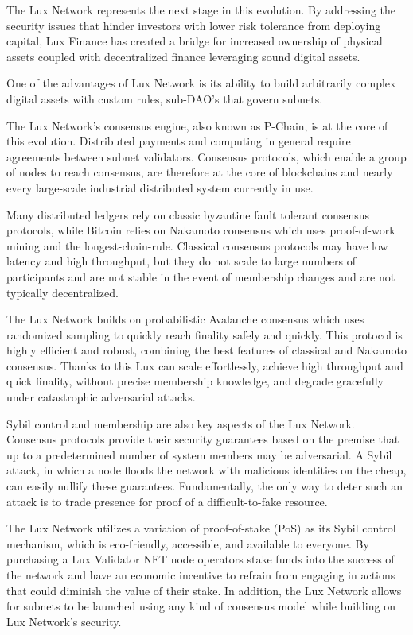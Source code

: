 \documentclass[11pt]{article}
\begin{document}
The Lux Network represents the next stage in this evolution. By addressing the security issues that hinder investors with lower risk tolerance from deploying capital, Lux Finance has created a bridge for increased ownership of physical assets coupled with decentralized finance leveraging sound digital assets.


One of the advantages of Lux Network is its ability to build arbitrarily complex digital assets with custom rules, sub-DAO's that govern subnets.


The Lux Network's consensus engine, also known as P-Chain, is at the core of this evolution. Distributed payments and computing in general require agreements between subnet validators. Consensus protocols, which enable a group of nodes to reach consensus, are therefore at the core of blockchains and nearly every large-scale industrial distributed system currently in use.


Many distributed ledgers rely on classic byzantine fault tolerant consensus protocols, while Bitcoin relies on Nakamoto consensus which uses proof-of-work mining and the longest-chain-rule. Classical consensus protocols may have low latency and high throughput, but they do not scale to large numbers of participants and are not stable in the event of membership changes and are not typically decentralized.


The Lux Network builds on probabilistic Avalanche consensus which uses randomized sampling to quickly reach finality safely and quickly. This protocol is highly efficient and robust, combining the best features of classical and Nakamoto consensus. Thanks to this Lux can scale effortlessly, achieve high throughput and quick finality, without precise membership knowledge, and degrade gracefully under catastrophic adversarial attacks.


Sybil control and membership are also key aspects of the Lux Network. Consensus protocols provide their security guarantees based on the premise that up to a predetermined number of system members may be adversarial. A Sybil attack, in which a node floods the network with malicious identities on the cheap, can easily nullify these guarantees. Fundamentally, the only way to deter such an attack is to trade presence for proof of a difficult-to-fake resource.


The Lux Network utilizes a variation of proof-of-stake (PoS) as its Sybil control mechanism, which is eco-friendly, accessible, and available to everyone. By purchasing a Lux Validator NFT node operators stake funds into the success of the network and have an economic incentive to refrain from engaging in actions that could diminish the value of their stake. In addition, the Lux Network allows for subnets to be launched using any kind of consensus model while building on Lux Network's security.
\end{document}
